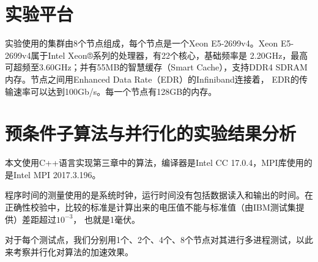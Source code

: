 \section{实验平台}

实验使用的集群由8个节点组成，每个节点是一个Xeon E5-2699v4。Xeon E5-2699v4属于Intel Xeon®系列的处理器，有22个核心，基础频率是
2.20GHz，最高可超频至3.60GHz；并有55MB的智慧缓存（Smart Cache），支持DDR4 SDRAM内存。节点之间用Enhanced Data Rate（EDR）的Infiniband连接着，
EDR的传输速率可以达到100Gb/s。每一个节点有128GB的内存。

\section{预条件子算法与并行化的实验结果分析}

本文使用C++语言实现第三章中的算法，编译器是Intel CC 17.0.4，MPI库使用的是Intel MPI 2017.3.196。

程序时间的测量使用的是系统时钟，运行时间没有包括数据读入和输出的时间。在正确性校验中，比较的标准是计算出来的电压值不能与标准值（由IBM测试集提供）差距超过$10^{-3}$，
也就是1毫伏。

对于每个测试点，我们分别用1个、2个、4个、8个节点对其进行多进程测试，以此来考察并行化对算法的加速效果。

